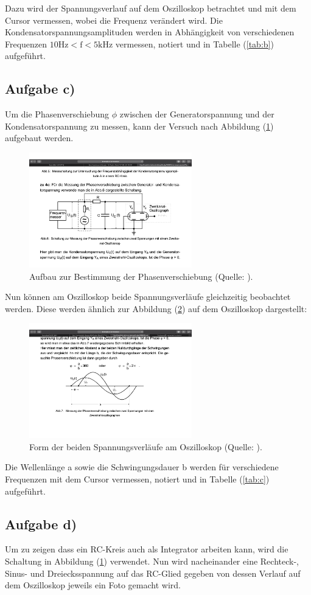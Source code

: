 \noindent
Dazu wird der Spannungsverlauf auf dem Oszilloskop betrachtet und mit dem Cursor vermessen, wobei die Frequenz verändert wird.
Die Kondensatorspannungsamplituden werden in Abhängigkeit von verschiedenen Frequenzen $10\si{\hertz} < \text{f} < 5\si{\kilo\hertz}$ vermessen, notiert und in Tabelle (\ref{tab:b}) aufgeführt.

\subsection{Aufgabe c)}
Um die Phasenverschiebung $\phi$ zwischen der Generatorspannung und der Kondensatorspannung zu messen, kann der Versuch nach Abbildung (\ref{fig:rcac}) aufgebaut werden.

\newpage
\begin{figure}
            \centering
               \includegraphics[height=5cm]{rcac.pdf}
               \caption{Aufbau zur Bestimmung der Phasenverschiebung (Quelle: \cite{V353}).}
               \label{fig:rcac}
\end{figure}

\noindent
Nun können am Oszilloskop beide Spannungsverläufe gleichzeitig beobachtet werden.
Diese werden ähnlich zur Abbildung (\ref{fig:rcac2}) auf dem Oszilloskop dargestellt:

\begin{figure}
            \centering
               \includegraphics[height=5cm]{rcac2.pdf}
               \caption{Form der beiden Spannungsverläufe am Oszilloskop (Quelle: \cite{V353}).}
               \label{fig:rcac2}
\end{figure}

\noindent
Die Wellenlänge a sowie die Schwingungsdauer b werden für verschiedene Frequenzen mit dem Cursor vermessen, notiert und in Tabelle (\ref{tab:c}) aufgeführt. 

\subsection{Aufgabe d)}
Um zu zeigen dass ein RC-Kreis auch als Integrator arbeiten kann, wird die Schaltung in Abbildung (\ref{fig:rcac}) verwendet.
Nun wird nacheinander eine Rechteck-, Sinus- und Dreiecksspannung auf das RC-Glied gegeben von dessen Verlauf auf dem Oszilloskop jeweils ein Foto gemacht wird. 
